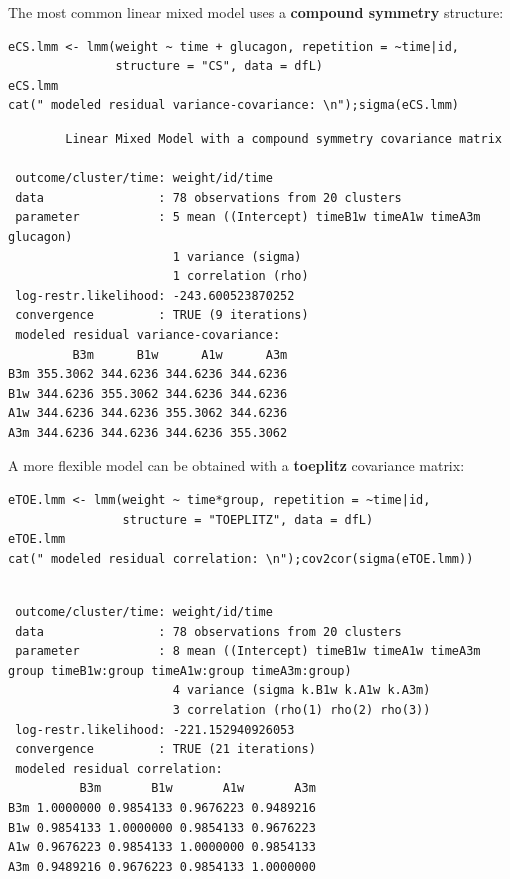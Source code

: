 \documentclass[12pt]{article}
\begin{document}
\clearpage

The most common linear mixed model uses a \textbf{compound symmetry} structure:
\lstset{language=r,label= ,caption= ,captionpos=b,numbers=none}
\begin{lstlisting}
eCS.lmm <- lmm(weight ~ time + glucagon, repetition = ~time|id,
               structure = "CS", data = dfL)
eCS.lmm
cat(" modeled residual variance-covariance: \n");sigma(eCS.lmm)
\end{lstlisting}

\begin{verbatim}
		Linear Mixed Model with a compound symmetry covariance matrix 

 outcome/cluster/time: weight/id/time 
 data                : 78 observations from 20 clusters 
 parameter           : 5 mean ((Intercept) timeB1w timeA1w timeA3m glucagon) 
                       1 variance (sigma) 
                       1 correlation (rho) 
 log-restr.likelihood: -243.600523870252 
 convergence         : TRUE (9 iterations)
 modeled residual variance-covariance: 
         B3m      B1w      A1w      A3m
B3m 355.3062 344.6236 344.6236 344.6236
B1w 344.6236 355.3062 344.6236 344.6236
A1w 344.6236 344.6236 355.3062 344.6236
A3m 344.6236 344.6236 344.6236 355.3062
\end{verbatim}

\noindent A more flexible model can be obtained with a \textbf{toeplitz} covariance matrix:
\lstset{language=r,label= ,caption= ,captionpos=b,numbers=none}
\begin{lstlisting}
eTOE.lmm <- lmm(weight ~ time*group, repetition = ~time|id,
                structure = "TOEPLITZ", data = dfL)
eTOE.lmm
cat(" modeled residual correlation: \n");cov2cor(sigma(eTOE.lmm))
\end{lstlisting}

\begin{verbatim}

 outcome/cluster/time: weight/id/time 
 data                : 78 observations from 20 clusters 
 parameter           : 8 mean ((Intercept) timeB1w timeA1w timeA3m group timeB1w:group timeA1w:group timeA3m:group) 
                       4 variance (sigma k.B1w k.A1w k.A3m) 
                       3 correlation (rho(1) rho(2) rho(3)) 
 log-restr.likelihood: -221.152940926053 
 convergence         : TRUE (21 iterations)
 modeled residual correlation: 
          B3m       B1w       A1w       A3m
B3m 1.0000000 0.9854133 0.9676223 0.9489216
B1w 0.9854133 1.0000000 0.9854133 0.9676223
A1w 0.9676223 0.9854133 1.0000000 0.9854133
A3m 0.9489216 0.9676223 0.9854133 1.0000000
\end{verbatim}
\end{document}
